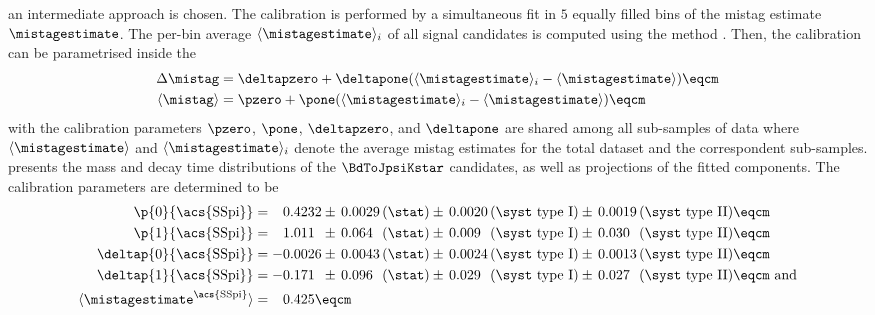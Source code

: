 an intermediate approach is chosen. The calibration is performed by a
simultaneous fit in $\num{5}$ equally filled bins of the mistag estimate
$\mistagestimate$. The per-bin average $\langle\mistagestimate\rangle_i$ of all
signal candidates is computed using the \splot method \cite{Pivk:2004ty}. Then,
the calibration can be parametrised inside the \PDF
%
\begin{equation}
  \begin{split}
    \Delta\mistag         &= \deltapzero + \deltapone ( \langle\mistagestimate\rangle_i - \langle\mistagestimate\rangle )\eqcm \\
    \langle\mistag\rangle &= \pzero + \pone ( \langle\mistagestimate\rangle_i - \langle\mistagestimate\rangle )\eqcm
  \end{split}
\end{equation}
%
with the calibration parameters $\pzero$, $\pone$, $\deltapzero$, and
$\deltapone$ are shared among all sub-samples of data where
$\langle\mistagestimate\rangle$ and $\langle\mistagestimate\rangle_i$ denote the
average mistag estimates for the total dataset and the correspondent
sub-samples.  presents the mass and
decay time distributions of the $\BdToJpsiKstar$ candidates, as well as
projections of the fitted \PDF components. The calibration parameters are
determined to be
%
\begin{equation}\label{eq:flavour_tagging:calibration:ss:parameters}
  \begin{split}
    \p{0}{\text{\acs{SSpi}}}        &= \phantom{+}0.4232 \pm\, 
                                       0.0029 \text{\,(\stat)} \pm\, 
                                       0.0020 \text{\,(\syst type I)} \pm\, 
                                       0.0019 \text{\,(\syst type II)} \eqcm\\ %
    \p{1}{\text{\acs{SSpi}}}        &= \phantom{+}1.011\phantom{0} \pm\, 
                                       0.064\phantom{0} \text{\,(\stat)} \pm\, 
                                       0.009\phantom{0} \text{\,(\syst type I)} \pm\, 
                                       0.030\phantom{0} \text{\,(\syst type II)} \eqcm\\ %
    \deltap{0}{\text{\acs{SSpi}}} &= -0.0026 \pm\, 
                                      0.0043 \text{\,(\stat)} \pm\, 
                                      0.0024 \text{\,(\syst type I)} \pm\, 
                                      0.0013 \text{\,(\syst type II)} \eqcm \\
    \deltap{1}{\text{\acs{SSpi}}} &= -0.171\phantom{0} \pm\, 
                                      0.096\phantom{0} \text{\,(\stat)} \pm\, 
                                      0.029\phantom{0} \text{\,(\syst type I)} \pm\, 
                                      0.027\phantom{0} \text{\,(\syst type II)} \eqcm\text{ and} \\
    \langle\mistagestimate^{\text{\acs{SSpi}}}\rangle &= \phantom{+}0.425 \eqcm
  \end{split}
\end{equation}
